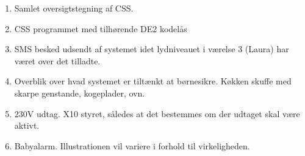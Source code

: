 \begin{enumerate}
\item Samlet oversigtstegning af CSS. 
\item CSS programmet med tilhørende DE2 kodelås
\item SMS besked udsendt af systemet idet lydniveauet i værelse 3 (Laura) har været over det tilladte.
\item Overblik over hvad systemet er tiltænkt at børnesikre. Køkken skuffe med skarpe genstande, kogeplader, ovn.
\item 230V udtag. X10 styret, således at det bestemmes om der udtaget skal være aktivt.
\item Babyalarm. Illustrationen vil variere i forhold til virkeligheden.
\end{enumerate}

%
%
